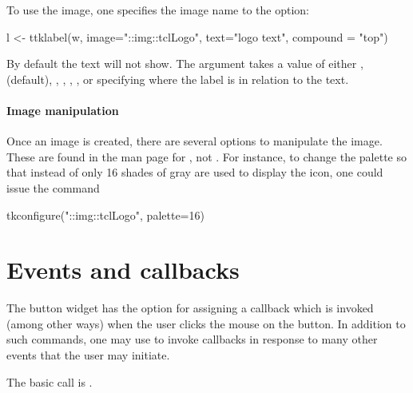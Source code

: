 To use the image, one specifies the image name to the
 option:
\begin{Schunk}
\begin{Sinput}
 l <- ttklabel(w, image="::img::tclLogo", text="logo text", 
               compound = "top")
\end{Sinput}
\end{Schunk}

By default the text will not show. The 
argument takes a value of either , 
(default), , , , ,
or  specifying where the label is in relation to the
text.

\paragraph{Image manipulation}
Once an image is created, there are several options to manipulate the
image. These are found in the \TK\/ man page for , not
. For instance, to change the palette so that instead of
 only 16 shades of gray are used to display the icon,
one could issue the command
\begin{Schunk}
\begin{Sinput}
 tkconfigure("::img::tclLogo", palette=16)
\end{Sinput}
\end{Schunk}




\section{Events and callbacks}
\label{sec:tcltk:overview:events-callbacks}

The button widget has the  option for assigning a
callback which is invoked (among other ways) when the user clicks the
mouse on the button. In addition to such commands, one may use
 to invoke callbacks in response to many other events
that the user may initiate.

The basic call is . 


